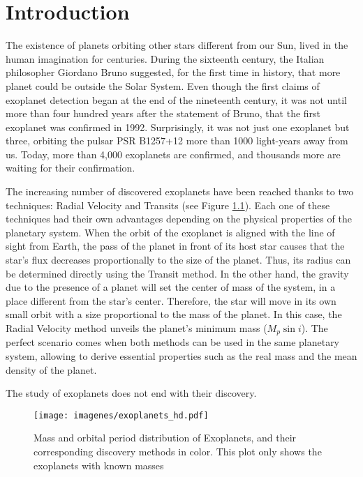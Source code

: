 \chapter{Introduction}\label{chap:intro}
The existence of planets orbiting other stars different from our Sun, lived in the human imagination for centuries. During the sixteenth century, the Italian philosopher Giordano Bruno suggested, for the first time in history, that more planet could be outside the Solar System. Even though the first claims of exoplanet detection began at the end of the nineteenth century, it was not until more than four hundred years after the statement of Bruno, that the first exoplanet was confirmed in 1992. Surprisingly, it was not just one exoplanet but three, orbiting the pulsar PSR B1257+12 more than 1000 light-years away from us. Today, more than 4,000 exoplanets are confirmed, and thousands more are waiting for their confirmation.

The increasing number of discovered exoplanets have been reached thanks to two techniques: Radial Velocity and Transits (see Figure \ref{exoplanets}). Each one of these techniques had their own advantages depending on the physical properties of the planetary system. When the orbit of the exoplanet is aligned with the line of sight from Earth, the pass of the planet in front of its host star causes that the star's flux decreases proportionally to the size of the planet. Thus, its radius can be determined directly using the Transit method. In the other hand, the gravity due to the presence of a planet will set the center of mass of the system, in a place different from the star's center. Therefore, the star will move in its own small orbit with a size proportional to the mass of the planet. In this case, the Radial Velocity method unveils the planet's minimum mass ($M_{p}\sin i$). The perfect scenario comes when both methods can be used in the same planetary system, allowing to derive essential properties such as the real mass and the mean density of the planet.

The study of exoplanets does not end with their discovery. 

\begin{figure}[ht]
\centering
\texttt{[image: imagenes/exoplanets\_hd.pdf]}
\caption{Mass and orbital period distribution of Exoplanets, and their corresponding discovery methods in color. This plot only shows the exoplanets with known masses}
\label{exoplanets}
\end{figure}

